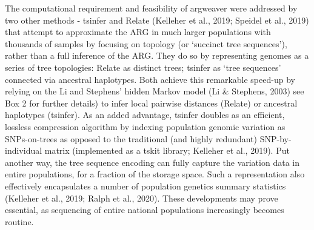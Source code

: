 \documentclass[twocolumn]{bmcart}%
\begin{document}
The computational requirement and feasibility of argweaver were addressed by two other methods - tsinfer and Relate (Kelleher et al., 2019; Speidel et al., 2019) that attempt to approximate the ARG in much larger populations with thousands of samples by focusing on topology (or ‘succinct tree sequences’), rather than a full inference of the ARG. They do so by representing genomes as a series of tree topologies: Relate as distinct trees; tsinfer as ‘tree sequences’ connected via ancestral haplotypes. Both achieve this remarkable speed-up by relying on the Li and Stephens’ hidden Markov model (Li \& Stephens, 2003) see Box 2 for further details) to infer local pairwise distances (Relate) or ancestral haplotypes (tsinfer). As an added advantage, tsinfer doubles as an efficient, lossless compression algorithm by indexing population genomic variation as SNPs-on-trees as opposed to the traditional (and highly redundant) SNP-by-individual matrix (implemented as a tskit library; Kelleher et al., 2019). Put another way, the tree sequence encoding can fully capture the variation data in entire populations, for a fraction of the storage space. Such a representation also effectively encapsulates a number of population genetics summary statistics (Kelleher et al., 2019; Ralph et al., 2020). These developments may prove essential, as sequencing of entire national populations increasingly becomes routine.
\end{document}
